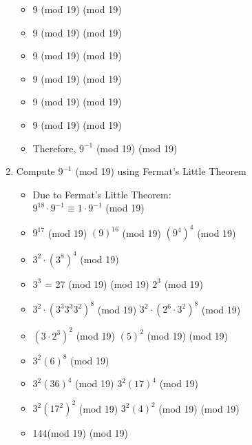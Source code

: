 \documentclass[11pt]{article}
\newcounter{prnum}
\newenvironment{problem}{{\vskip 0.2in\noindent\bf Problem
       \addtocounter{prnum}{1} \arabic{prnum}.}}{\vskip 0.1in}
\begin{document}
\begin{problem}
\begin{enumerate}
\begin{itemize}
        \item 9   (mod 19)  (mod 19)
        \item 9   (mod 19)  (mod 19)
        \item 9   (mod 19)  (mod 19)
        \item 9   (mod 19)  (mod 19)
        \item 9   (mod 19)  (mod 19)
        \item 9   (mod 19)  (mod 19)
        \item Therefore, $9^{-1}$ (mod 19) (mod 19)
      \end{itemize}
      \pagebreak

    \item Compute $9^{-1}$ (mod 19) using Fermat's Little Theorem
      \begin{itemize}
        \item Due to Fermat's Little Theorem:\\
          $9^{18}\cdot9^{-1} \equiv 1\cdot9^{-1}$ (mod 19)
        \item $9^{17}$ (mod 19)  $(9)^{16}$ (mod 19)  $(9^{4})^{4}$ (mod 19)
        \item $3^{2} \cdot (3^{8})^{4}$ (mod 19)
        \item $3^3$ = 27 (mod 19)  (mod 19) \Rightarrow $2^3$ (mod 19)
        \item $3^2\cdot(3^3 3^3 3^2)^8 $ (mod 19) \equiv $3^2 \cdot (2^6\cdot3^2)^8$ (mod 19)
        \item $(3\cdot 2^3)^2$ (mod 19) \equiv $(5)^2$ (mod 19)  (mod 19)
        \item $3^2 (6)^8$ (mod 19)
        \item $3^2 (36)^4$ (mod 19) \equiv\space $3^2 (17)^4$ (mod 19)
        \item $3^2 (17^2)^2$ (mod 19) \equiv\space $3^2 (4)^2$ (mod 19)  (mod 19)
        \item 144(mod 19) (mod 19)
      \end{itemize}


\end{enumerate}
\end{problem}
\end{document}
